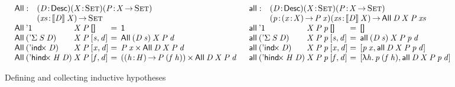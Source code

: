 \begin{figure*}

\[
\begin{array}{ll}
\stk{
\begin{array}{@{}ll}
\SYMBAll : & \PITEL{\V{D}}{\Desc}
             \PITEL{\V{X}}{\Set}
             \PITEL{\V{P}}{\V{X} \To \Set} \\
           & \PI{\V{xs}}{\descop{\V{D}}{\V{X}}} 
             \Set 
\end{array} \\
\begin{array}{@{}l@{}l@{\:=\:\:}l}
\All{\DUnit}{& \V{X}}{\V{P}}{\Void} &
    \Unit \\
\All{(\DSigma{\V{S}}{\V{D}})}{& \V{X}}{\V{P}}{\pair{\V{s}}{\V{d}}{}} &
    \All{(\V{D}\: \V{s})}{\V{X}}{\V{P}}{\V{d}} \\
\All{(\DIndx{\V{D}})}{& \V{X}}{\V{P}}{\pair{\V{x}}{\V{d}}{}} &
    \TIMES{\V{P}\: \V{x}}{\All{\V{D}}{\V{X}}{\V{P}}{\V{d}}} \\
\All{(\DHindx{\V{H}}{\V{D}})}{& \V{X}}{\V{P}}{\pair{\V{f}}{\V{d}}{}} &
    \TIMES{(\PI{\V{h}}{\V{H}} \V{P}\: (\V{f}\: \V{h}))}
          {\All{\V{D}}{\V{X}}{\V{P}}{\V{d}}}
\end{array}
}
&
\stk{
\begin{array}{@{}ll}
\SYMBall : & \PITEL{\V{D}}{\Desc}
             \PITEL{\V{X}}{\Set}
             \PITEL{\V{P}}{\V{X} \To \Set} \\
           & \PITEL{\V{p}}{\PI{\V{x}}{\V{X}} \V{P}\: \V{x}}
             \PI{\V{xs}}{\descop{\V{D}}{\V{X}}} 
             \All{\V{D}}{\V{X}}{\V{P}}{\V{xs}} 
\end{array} \\
\begin{array}{@{}l@{}l@{\:=\:\:}l}
\all{\DUnit}{& \V{X}}{\V{P}}{\V{p}}{\Void} &
    \Void \\
\all{(\DSigma{\V{S}}{\V{D}})}{& \V{X}}{\V{P}}{\V{p}}{\pair{\V{s}}{\V{d}}{}} &
    \all{(\V{D}\: \V{s})}{\V{X}}{\V{P}}{\V{p}}{\V{d}} \\
\all{(\DIndx{\V{D}})}{& \V{X}}{\V{P}}{\V{p}}{\pair{\V{x}}{\V{d}}{}} &
    \pair{\V{p}\: \V{x}}
         {\all{\V{D}}{\V{X}}{\V{P}}{\V{p}}{\V{d}}}{} \\
\all{(\DHindx{\V{H}}{\V{D}})}{& \V{X}}{\V{P}}{\V{p}}{\pair{\V{f}}{\V{d}}{}} &
    \pair{\LAM{\V{h}} \V{p}\: (\V{f}\: \V{h})}
         {\all{\V{D}}{\V{X}}{\V{P}}{\V{p}}{\V{d}}}{}
\end{array}
\end{array}
}
\]

\caption{Defining and collecting inductive hypotheses}
\label{fig:all-predicates}

\end{figure*}


